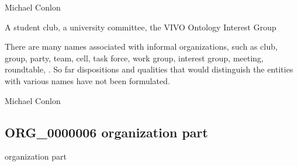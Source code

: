 \documentclass[letterpaper,10pt,english]{sphinxmanual}
\begin{document}
\begin{sphinxShadowBox}

\sphinxAtStartPar
Michael Conlon 
\end{sphinxShadowBox}

\begin{sphinxShadowBox}

\sphinxAtStartPar
A student club, a university committee, the VIVO Ontology Interest Group
\end{sphinxShadowBox}

\begin{sphinxShadowBox}

\sphinxAtStartPar
There are many names associated with informal organizations, such as club, group, party, team, cell, task force, work group, interest group, meeting, roundtable, .  So far dispositions and qualities that would distinguish the entities with various names have not been formulated.
\end{sphinxShadowBox}

\begin{sphinxShadowBox}

\sphinxAtStartPar
Michael Conlon 
\end{sphinxShadowBox}
\begin{quote}

\ignorespaces \end{quote}


\subsection{ORG\_0000006 \sphinxhyphen{} organization part}
\label{\detokenize{doc-ORG_0000006:org-0000006-organization-part}}\label{\detokenize{doc-ORG_0000006:index-0}}\label{\detokenize{doc-ORG_0000006::doc}}
\begin{sphinxShadowBox}

\sphinxAtStartPar
organization part
\end{sphinxShadowBox}

\begin{sphinxShadowBox}

\sphinxAtStartPar
{\hyperref[\detokenize{doc-ORG_0000001::doc}]{}}
\end{sphinxShadowBox}
\end{document}
